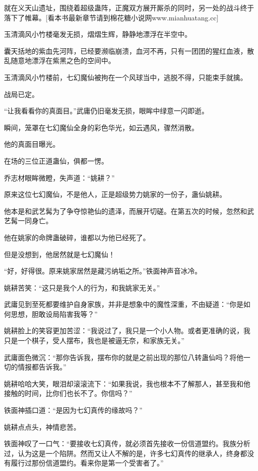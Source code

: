
\begin{this_body}

就在义天山遗址，围绕着超级蛊阵，正魔双方展开厮杀的同时，另一处的战斗终于落下了帷幕。[看本书最新章节请到棉花糖小说网www.mianhuatang.cc]

玉清滴风小竹楼毫发无损，熠熠生辉，静静地漂浮在半空中。

囊天括地的紫血先河阵，已经要濒临崩溃，血河不再，只有一团团的猩红血液，散乱随意地漂浮在紫黑之色的空间中。

玉清滴风小竹楼前，七幻魔仙被拘在一个风球当中，逃脱不得，只能束手就擒。

战局已定。

“让我看看你的真面目。”武庸仍旧毫发无损，眼眸中绿意一闪即逝。

瞬间，笼罩在七幻魔仙全身的彩色华光，如云遇风，骤然消散。

他的真面目曝光。

在场的三位正道蛊仙，俱都一愣。

乔志材眼眸微瞪，失声道：“姚耕？”

原来这位七幻魔仙，不是他人，正是超级势力姚家的一份子，蛊仙姚耕。

他本是和武艺髯为了争夺惊艳仙的遗泽，而展开切磋。在第五次的时候，忽然和武艺髯一同身亡。

他在姚家的命牌蛊破碎，谁都以为他已经死了。

但是没想到，他居然就是七幻魔仙！

“好，好得很。原来姚家居然是藏污纳垢之所。”铁面神声音冰冷。

姚耕苦笑：“这只是我个人的行为，和我姚家无关。”

武庸见到至死都要维护自身家族，并非是想象中的魔性深重，不由疑道：“你是如何思想，胆敢设局陷害我等？”

姚耕脸上的笑容更加苦涩：“我说过了，我只是一个小人物。或者更准确的说，我只是一个棋子，受人摆布，我也是被逼无奈，和家族无关。”

武庸面色微沉：“那你告诉我，摆布你的就是之前出现的那位八转蛊仙吗？将他一切的情报都告诉我。”

姚耕哈哈大笑，眼泪却滚滚流下：“如果我说，我也根本不了解那人，甚至我和他接触的时间，比你们也长不了。你信吗？”

铁面神插口道：“是因为七幻真传的缘故吗？”

姚耕点点头，神情悲苦。

铁面神叹了一口气：“要接收七幻真传，就必须首先接收一份信道盟约。我族分析过，认为这是一个陷阱。然而又让人不解的是，许多七幻真传的继承人，终身都没有履行过那份信道盟约。看来你是第一个受害者了。”


\end{this_body}
